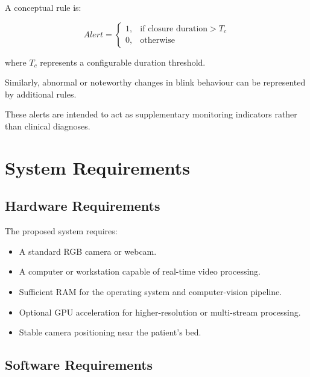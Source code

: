 \documentclass[12pt]{tietreport}
\begin{document}
A conceptual rule is:

\begin{equation}
Alert =
\begin{cases}
1, & \text{if closure duration} > T_c\\
0, & \text{otherwise}
\end{cases}
\end{equation}

where $T_c$ represents a configurable duration threshold.

Similarly, abnormal or noteworthy changes in blink behaviour can be
represented by additional rules.

These alerts are intended to act as supplementary monitoring
indicators rather than clinical diagnoses.


\chapter{System Requirements}

\section{Hardware Requirements}

The proposed system requires:

\begin{itemize}[leftmargin=*]
    \item A standard RGB camera or webcam.
    \item A computer or workstation capable of real-time video
    processing.
    \item Sufficient RAM for the operating system and computer-vision
    pipeline.
    \item Optional GPU acceleration for higher-resolution or
    multi-stream processing.
    \item Stable camera positioning near the patient's bed.
\end{itemize}

\section{Software Requirements}
\end{document}
